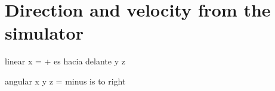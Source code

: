 \chapter{Direction and velocity from the simulator}

linear
x = + es hacia delante
y
z

angular
x
y
z = minus is to right